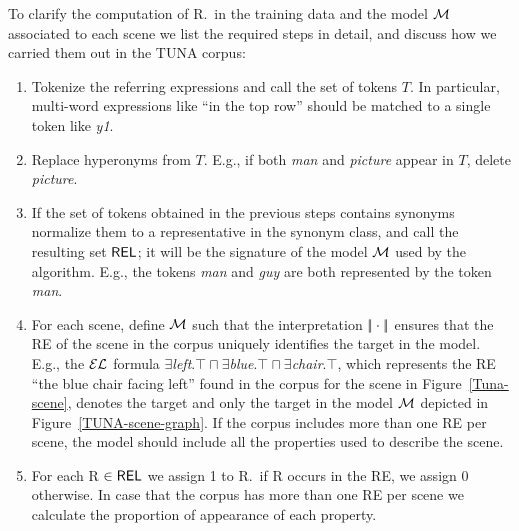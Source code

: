 
To clarify the computation of R.\puse\ in the training data and the model $\mathcal{M}$ associated to each scene we list the required steps in detail, 
and discuss how we carried them out in the TUNA corpus:

\begin{enumerate}
\item Tokenize the referring expressions and call the set of tokens $T$. In particular, multi-word expressions like ``in the top row'' 
should be matched to a single token like \emph{y1}.

\item Replace hyperonyms from $T$. E.g., if both \emph{man} and \emph{picture} appear in $T$, delete \emph{picture}.

\item If the set of tokens obtained in the previous steps contains synonyms normalize them to a representative in the synonym class, 
and call the resulting set $\textsf{REL}$; it will be the signature of the model $\mathcal{M}$ used by the algorithm. E.g., the tokens \emph{man} 
and \emph{guy} are both represented by the token \emph{man}.

\item For each scene, define $\mathcal{M}$ such that the interpretation $|\!|\cdot|\!|$ ensures that the RE of the scene in the corpus uniquely identifies the target in the model. E.g., the $\mathcal{EL}$ formula $\exists$\emph{left}.$\top \sqcap \exists$\emph{blue}.$\top \sqcap \exists$\emph{chair}.$\top$, which represents the RE ``the blue chair facing left'' found in the corpus for the scene in Figure~\ref{Tuna-scene}, denotes the target and only the target in the model $\mathcal{M}$ depicted in Figure~\ref{TUNA-scene-graph}. If the corpus includes more than one RE per scene, the model should include all the properties used to describe the scene.

\item For each R $\in \textsf{REL}$ we assign 1 to R.\puse\ if R occurs in the RE, we assign 0 otherwise. In case that the corpus has more than one RE per scene we calculate the proportion of appearance of each property.

\end{enumerate}



